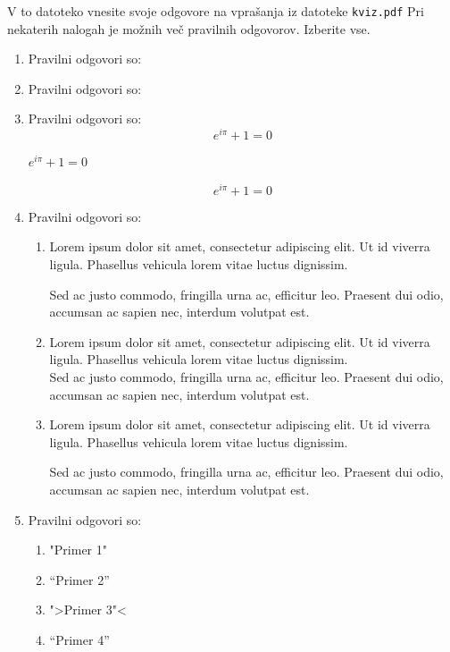 \documentclass[11pt]{article}
\begin{document}
V to datoteko vnesite svoje odgovore na vprašanja iz datoteke \texttt{kviz.pdf}
Pri nekaterih nalogah je možnih več pravilnih odgovorov. Izberite vse.

\begin{enumerate}
    \item Pravilni odgovori so: %
    \item Pravilni odgovori so: %
    \item Pravilni odgovori so:  %
      \[ e^{i \pi} + 1 = 0 \]
      \begin{center}
          \( e^{i \pi} + 1 = 0 \)
      \end{center}
      \begin{equation*}
          e^{i \pi} + 1 = 0
      \end{equation*}

    \item Pravilni odgovori so: %
        \begin{enumerate}
            \item {
Lorem ipsum dolor sit amet, consectetur adipiscing 
elit. Ut id viverra ligula. Phasellus vehicula lorem 
vitae luctus dignissim. 
                
Sed ac justo commodo, fringilla urna ac, efficitur 
leo. Praesent dui odio, accumsan ac sapien nec, 
interdum volutpat est. 
            }
            \item {
Lorem ipsum dolor sit amet, consectetur adipiscing 
elit. Ut id viverra ligula. Phasellus vehicula lorem 
vitae luctus dignissim. \\
Sed ac justo commodo, fringilla urna ac, efficitur 
leo. Praesent dui odio, accumsan ac sapien nec, 
interdum volutpat est.             }
            \item {
Lorem ipsum dolor sit amet, consectetur adipiscing 
elit. Ut id viverra ligula. Phasellus vehicula lorem 
vitae luctus dignissim. \par
Sed ac justo commodo, fringilla urna ac, efficitur 
leo. Praesent dui odio, accumsan ac sapien nec, 
interdum volutpat est.             }
        \end{enumerate}
    
      \item Pravilni odgovori so: %
        \begin{enumerate}
          \item "Primer 1"
          \item ``Primer 2''
          \item ">Primer 3"<
          \item "`Primer 4"'
        \end{enumerate}


\end{enumerate}
\end{document}
